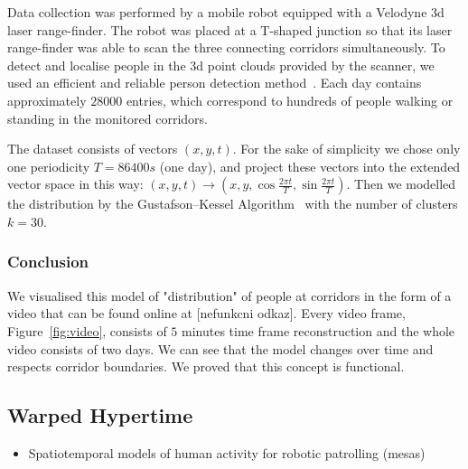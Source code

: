 Data collection was performed by a mobile robot equipped with a Velodyne 3d laser range-finder.
The robot was placed at a T-shaped junction so that its laser range-finder was able to scan the three connecting corridors simultaneously.
To detect and localise people in the 3d point clouds provided by the scanner, we used an efficient and reliable person detection method~\cite{yan2017online}.
Each day contains approximately $28000$ entries, which correspond to hundreds of people walking or standing in the monitored corridors.

The dataset consists of vectors $\left(x, y, t\right)$.
For the sake of simplicity we chose only one periodicity $T = 86400 s$ (one day), and project these vectors into the extended vector space in this way: $\left(x, y, t\right) \rightarrow \left(x, y, \cos\frac{2\pi t}{T}, \sin\frac{2\pi t}{T}\right)$.
Then we modelled the distribution by the Gustafson--Kessel Algorithm~\cite{gustafson1979fuzzy} with the number of clusters $k=30$.

\subsubsection{Conclusion}

We visualised this model of "distribution" of people at corridors in the form of a video that can be found online at [nefunkcni odkaz].
Every video frame, Figure~\ref{fig:video}, consists of $5$ minutes time frame reconstruction and the whole video consists of two days.
We can see that the model changes over time and respects corridor boundaries. 
We proved that this concept is functional.




\subsection{Warped Hypertime}

\begin{itemize}
    \item Spatiotemporal models of human activity for robotic patrolling (mesas)
\end{itemize}

